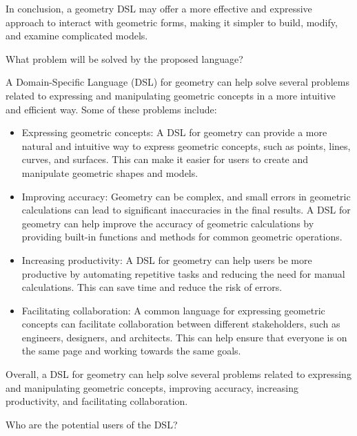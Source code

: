 \noindent In conclusion, a geometry DSL may offer a more effective and expressive approach to interact with geometric forms, making it simpler to build, modify, and examine complicated models.


\noindent What problem will be solved by the proposed language?      

A Domain-Specific Language (DSL) for geometry can help solve several problems related to expressing and manipulating geometric concepts in a more intuitive and efficient way. Some of these problems include:

\begin{itemize}

\item Expressing geometric concepts: A DSL for geometry can provide a more natural and intuitive way to express geometric concepts, such as points, lines, curves, and surfaces. This can make it easier for users to create and manipulate geometric shapes and models.

\item Improving accuracy: Geometry can be complex, and small errors in geometric calculations can lead to significant inaccuracies in the final results. A DSL for geometry can help improve the accuracy of geometric calculations by providing built-in functions and methods for common geometric operations.

\item Increasing productivity: A DSL for geometry can help users be more productive by automating repetitive tasks and reducing the need for manual calculations. This can save time and reduce the risk of errors.

\item Facilitating collaboration: A common language for expressing geometric concepts can facilitate collaboration between different stakeholders, such as engineers, designers, and architects. This can help ensure that everyone is on the same page and working towards the same goals.

\end{itemize}

\noindent Overall, a DSL for geometry can help solve several problems related to expressing and manipulating geometric concepts, improving accuracy, increasing productivity, and facilitating collaboration.

\noindent Who are the potential users of the DSL?

